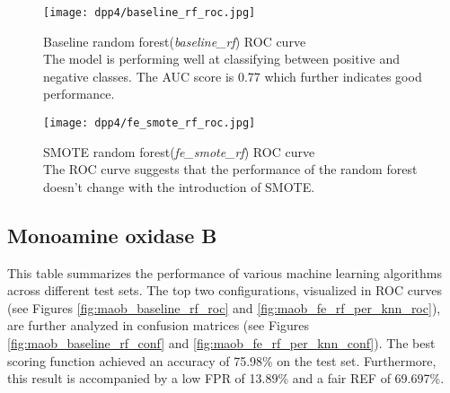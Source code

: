 \begin{figure}[H]
    \begin{center}
        \captionsetup{justification=centering}
        \texttt{[image: dpp4/baseline\_rf\_roc.jpg]}
        \caption[]{Baseline random forest(\textit{baseline\_rf}) ROC curve\\
            The model is performing well at classifying between positive and negative classes. The AUC score is 0.77 which further indicates good performance.
        }
        \label{fig:dpp4_baseline_rf_roc}
    \end{center}
\end{figure}

\begin{figure}[H]
    \begin{center}
        \captionsetup{justification=centering}
        \texttt{[image: dpp4/fe\_smote\_rf\_roc.jpg]}
        \caption[]{SMOTE random forest(\textit{fe\_smote\_rf}) ROC curve\\
            The ROC curve suggests that the performance of the random forest doesn't change with the introduction of SMOTE.
        }
        \label{fig:dpp4_smote_rf_roc}
    \end{center}
\end{figure}

\subsection{Monoamine oxidase B}
This table summarizes the performance of various machine learning algorithms across different test sets.
The top two configurations, visualized in ROC curves (see Figures \ref{fig:maob_baseline_rf_roc} and \ref{fig:maob_fe_rf_per_knn_roc}),
are further analyzed in confusion matrices (see Figures \ref{fig:maob_baseline_rf_conf} and \ref{fig:maob_fe_rf_per_knn_conf}).
The best scoring function achieved an accuracy of 75.98\% on the test set. Furthermore, this result is accompanied by a low FPR of 13.89\% and a fair REF of 69.697\%.

